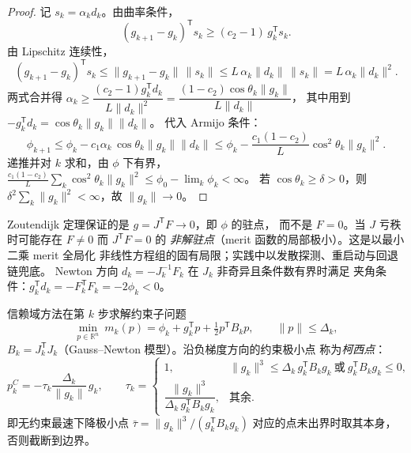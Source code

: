 \begin{proof}
记 $s_k=\alpha_k d_k$。由曲率条件，
\[
(g_{k+1}-g_k)^{\mathsf T}s_k\ge(c_2-1)\,g_k^{\mathsf T}s_k .
\]
由 Lipschitz 连续性，
\[
(g_{k+1}-g_k)^{\mathsf T}s_k\le\lVert g_{k+1}-g_k\rVert\,\lVert s_k\rVert
\le L\,\alpha_k\lVert d_k\rVert\,\lVert s_k\rVert
=L\,\alpha_k\lVert d_k\rVert^2 .
\]
两式合并得
$\alpha_k\ge\dfrac{(c_2-1)g_k^{\mathsf T}d_k}{L\lVert d_k\rVert^2}
=\dfrac{(1-c_2)\cos\theta_k\lVert g_k\rVert}{L\lVert d_k\rVert}$，
其中用到 $-g_k^{\mathsf T}d_k=\cos\theta_k\lVert g_k\rVert\lVert d_k\rVert$。
代入 Armijo 条件：
\[
\phi_{k+1}\le\phi_k-c_1\alpha_k\,\cos\theta_k\lVert g_k\rVert\lVert d_k\rVert
\le\phi_k-\frac{c_1(1-c_2)}{L}\cos^2\theta_k\lVert g_k\rVert^2 .
\]
递推并对 $k$ 求和，由 $\phi$ 下有界，
$\frac{c_1(1-c_2)}{L}\sum_k\cos^2\theta_k\lVert g_k\rVert^2
\le\phi_0-\lim_k\phi_k<\infty$。
若 $\cos\theta_k\ge\delta>0$，则
$\delta^2\sum_k\lVert g_k\rVert^2<\infty$，故 $\lVert g_k\rVert\to0$。
\end{proof}

\begin{remark}[对非线性方程组的含义]\label{sec:pf-th-glob-rem-stationary}
Zoutendijk 定理保证的是 $g=J^{\mathsf T}F\to0$，即 $\phi$ 的驻点，
而不是 $F=0$。当 $J$ 亏秩时可能存在 $F\ne0$ 而 $J^{\mathsf T}F=0$ 的
\emph{非解驻点}（merit 函数的局部极小）。这是以最小二乘 merit 全局化
非线性方程组的固有局限；实践中以发散探测、重启动与回退链兜底。
Newton 方向 $d_k=-J_k^{-1}F_k$ 在 $J_k$ 非奇异且条件数有界时满足
夹角条件：$g_k^{\mathsf T}d_k=-F_k^{\mathsf T}F_k=-2\phi_k<0$。
\end{remark}

\begin{definition}[信赖域子问题与柯西点]\label{sec:pf-th-glob-def-tr}
信赖域方法在第 $k$ 步求解约束子问题
\begin{equation}
\min_{p\in\mathbb R^n}\ m_k(p)=\phi_k+g_k^{\mathsf T}p
+\tfrac12 p^{\mathsf T}B_k p,
\qquad \lVert p\rVert\le\Delta_k,
\end{equation}
$B_k=J_k^{\mathsf T}J_k$（Gauss--Newton 模型）。沿负梯度方向的约束极小点
称为\emph{柯西点}：
\begin{equation}
p_k^{C}=-\tau_k\frac{\Delta_k}{\lVert g_k\rVert}\,g_k,
\qquad
\tau_k=\begin{cases}1,&\lVert g_k\rVert^3\le\Delta_k\,g_k^{\mathsf T}B_k g_k
\ \text{或}\ g_k^{\mathsf T}B_k g_k\le0,\\[2pt]
\dfrac{\lVert g_k\rVert^3}{\Delta_k\,g_k^{\mathsf T}B_k g_k},&\text{其余}.\end{cases}
\end{equation}
即无约束最速下降极小点 $\bar\tau=\lVert g_k\rVert^3/(g_k^{\mathsf T}B_k g_k)$
对应的点未出界时取其本身，否则截断到边界。
\end{definition}

